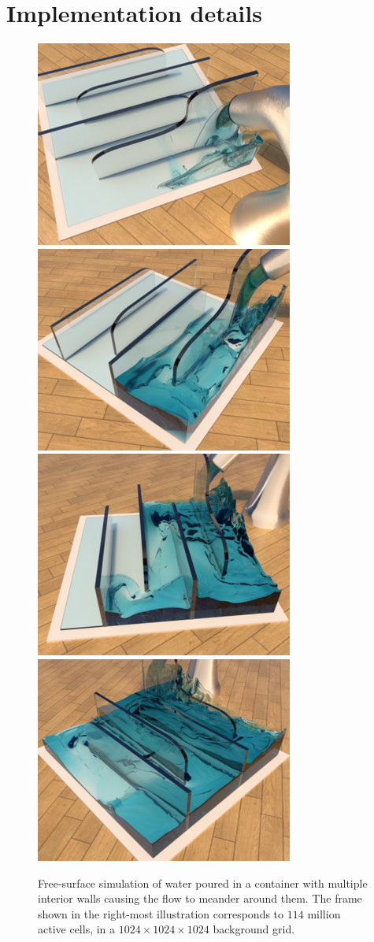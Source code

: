 \section{Implementation details}
\label{sec:implementation-details}


\begin{figure}[t!]
\begin{center}
\includegraphics[width=.236\textwidth]{images/DD/snake_channel_060.png}
\includegraphics[width=.236\textwidth]{images/DD/snake_channel_180.png}
\includegraphics[width=.236\textwidth]{images/DD/snake_channel_320.png}
\includegraphics[width=.236\textwidth]{images/DD/snake_channel_540.png}
\end{center}
\caption{Free-surface simulation of water poured in a container with multiple interior walls causing the flow to meander around them. The frame shown in the right-most illustration corresponds to $114$ million active cells, in a $1024\times1024\times1024$ background grid.}
\label{fig:snake-channel}
\end{figure}

